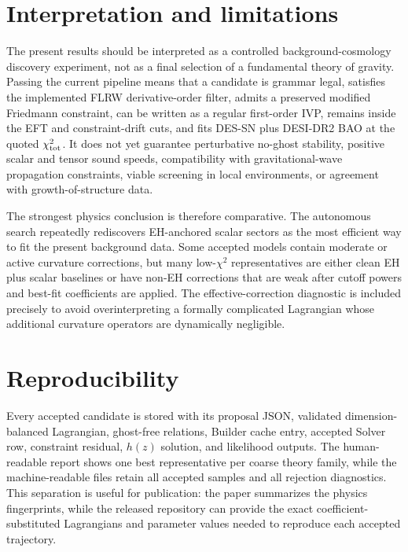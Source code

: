 \documentclass[aps,prd,twocolumn,superscriptaddress,nofootinbib,longbibliography]{revtex4-2}
\newcommand{\chiT}{\chi^2_{\rm tot}}
\begin{document}
\section{Interpretation and limitations}
\label{sec:interpretation}

The present results should be interpreted as a controlled background-cosmology discovery experiment, not as a final selection of a fundamental theory of gravity.  Passing the current pipeline means that a candidate is grammar legal, satisfies the implemented FLRW derivative-order filter, admits a preserved modified Friedmann constraint, can be written as a regular first-order IVP, remains inside the EFT and constraint-drift cuts, and fits DES-SN plus DESI-DR2 BAO at the quoted $\chiT$.  It does not yet guarantee perturbative no-ghost stability, positive scalar and tensor sound speeds, compatibility with gravitational-wave propagation constraints, viable screening in local environments, or agreement with growth-of-structure data.

The strongest physics conclusion is therefore comparative.  The autonomous search repeatedly rediscovers EH-anchored scalar sectors as the most efficient way to fit the present background data.  Some accepted models contain moderate or active curvature corrections, but many low-$\chi^2$ representatives are either clean EH plus scalar baselines or have non-EH corrections that are weak after cutoff powers and best-fit coefficients are applied.  The effective-correction diagnostic is included precisely to avoid overinterpreting a formally complicated Lagrangian whose additional curvature operators are dynamically negligible.

\section{Reproducibility}
\label{sec:reproducibility}

Every accepted candidate is stored with its proposal JSON, validated dimension-balanced Lagrangian, ghost-free relations, Builder cache entry, accepted Solver row, constraint residual, $h(z)$ solution, and likelihood outputs.  The human-readable report shows one best representative per coarse theory family, while the machine-readable files retain all accepted samples and all rejection diagnostics.  This separation is useful for publication: the paper summarizes the physics fingerprints, while the released repository can provide the exact coefficient-substituted Lagrangians and parameter values needed to reproduce each accepted trajectory.
\end{document}
